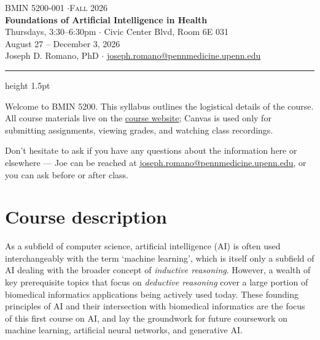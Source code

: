\documentclass[11pt]{article}
\begin{document}
\begin{center}
  {\color{inksoft}\small\scshape BMIN 5200-001 \quad$\cdot$\quad Fall 2026}\\[0.6em]
  {\LARGE\bfseries Foundations of Artificial Intelligence in Health}\\[0.9em]
  {\normalsize Thursdays, 3:30--6:30pm \quad$\cdot$ Civic Center Blvd, Room 6E 031}\\[0.2em]
  {\normalsize August 27 -- December 3, 2026}\\[0.2em]
  {\normalsize Joseph D. Romano, PhD \quad$\cdot$\quad
   \href{mailto:joseph.romano@pennmedicine.upenn.edu}{joseph.romano@pennmedicine.upenn.edu}}
\end{center}

\vspace{0.4em}
{\color{accent}\hrule height 1.5pt}
\vspace{0.8em}

Welcome to BMIN 5200. This syllabus outlines the logistical details of the course. All course
materials live on the \href{https://bmin5200.jdr.bio}{course website}; Canvas is used only for
submitting assignments, viewing grades, and watching class recordings.

Don't hesitate to ask if you have any questions about the information here or elsewhere --- Joe
can be reached at
\href{mailto:joseph.romano@pennmedicine.upenn.edu}{joseph.romano@pennmedicine.upenn.edu}, or you
can ask before or after class.

\section{Course description}

As a subfield of computer science, artificial intelligence (AI) is often used interchangeably
with the term `machine learning', which is itself only a subfield of AI dealing with the broader
concept of \emph{inductive reasoning}. However, a wealth of key prerequisite topics that focus on
\emph{deductive reasoning} cover a large portion of biomedical informatics applications being
actively used today. These founding principles of AI and their intersection with biomedical
informatics are the focus of this first course on AI, and lay the groundwork for future
coursework on machine learning, artificial neural networks, and generative AI.
\end{document}
